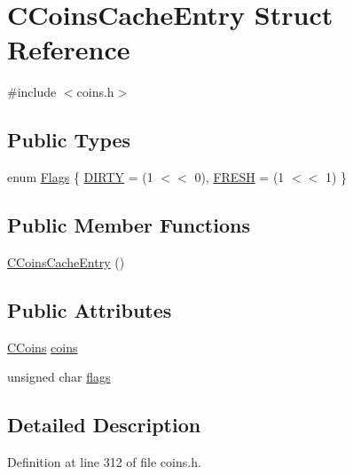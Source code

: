 \hypertarget{struct_c_coins_cache_entry}{}\section{C\+Coins\+Cache\+Entry Struct Reference}
\label{struct_c_coins_cache_entry}


{\ttfamily \#include $<$coins.\+h$>$}

\subsection*{Public Types}
\begin{DoxyCompactItemize}
\item 
enum \hyperlink{struct_c_coins_cache_entry_a1d5ac74da0f6ff5ab056e47ce79753c7}{Flags} \{ \hyperlink{struct_c_coins_cache_entry_a1d5ac74da0f6ff5ab056e47ce79753c7ac8cbd1b21d937e8618f9fecdf2c7223e}{D\+I\+R\+T\+Y} = (1 $<$$<$ 0), 
\hyperlink{struct_c_coins_cache_entry_a1d5ac74da0f6ff5ab056e47ce79753c7aae43958b088ff7b6e4f0daaafff00816}{F\+R\+E\+S\+H} = (1 $<$$<$ 1)
 \}
\end{DoxyCompactItemize}
\subsection*{Public Member Functions}
\begin{DoxyCompactItemize}
\item 
\hyperlink{struct_c_coins_cache_entry_ad241b5b23552ba45c0372b71f73d0f25}{C\+Coins\+Cache\+Entry} ()
\end{DoxyCompactItemize}
\subsection*{Public Attributes}
\begin{DoxyCompactItemize}
\item 
\hyperlink{class_c_coins}{C\+Coins} \hyperlink{struct_c_coins_cache_entry_a343585f1fcb810f9c21fc25ae42a1eba}{coins}
\item 
unsigned char \hyperlink{struct_c_coins_cache_entry_a05225c349f51777385e3a1c9b0eeaaed}{flags}
\end{DoxyCompactItemize}


\subsection{Detailed Description}


Definition at line 312 of file coins.\+h.



